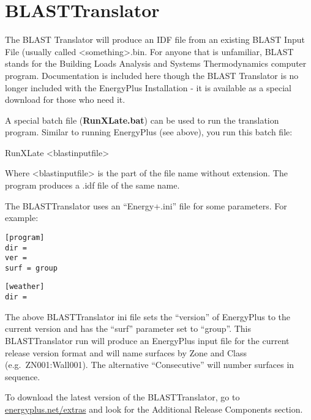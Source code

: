 \chapter{BLASTTranslator}\label{blasttranslator}

The BLAST Translator will produce an IDF file from an existing BLAST Input File (usually called \textless{}something\textgreater{}.bin. For anyone that is unfamiliar, BLAST stands for the Building Loads Analysis and Systems Thermodynamics computer program. Documentation is included here though the BLAST Translator is no longer included with the EnergyPlus Installation - it is available as a special download for those who need it.

A special batch file (\textbf{RunXLate.bat}) can be used to run the translation program. Similar to running EnergyPlus (see above), you run this batch file:

RunXLate \textless{}blastinputfile\textgreater{}

Where \textless{}blastinputfile\textgreater{} is the part of the file name without extension. The program produces a .idf file of the same name.

The BLASTTranslator uses an ``Energy+.ini'' file for some parameters. For example:

\begin{lstlisting}
[program]
dir =
ver =
surf = group
\end{lstlisting}

\begin{lstlisting}
[weather]
dir =
\end{lstlisting}

The above BLASTTranslator ini file sets the ``version'' of EnergyPlus to the current version and has the ``surf'' parameter set to ``group''. This BLASTTranslator run will produce an EnergyPlus input file for the current release version format and will name surfaces by Zone and Class (e.g.~ZN001:Wall001). The alternative ``Consecutive'' will number surfaces in sequence.

To download the latest version of the BLASTTranslator, go to \href{https://energyplus.net/extras}{energyplus.net/extras} and look for the Additional Release Components section.